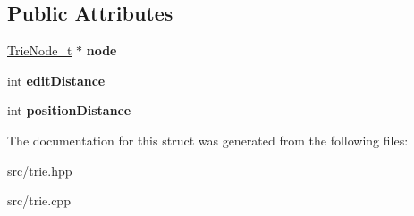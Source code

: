 \subsection*{Public Attributes}
\begin{DoxyCompactItemize}
\item 
\hyperlink{classtrie_1_1TrieNode__t}{Trie\+Node\+\_\+t} $\ast$ {\bfseries node}\hypertarget{structtrie_1_1ActiveNode__t_ad0756df7e15cf7b3eb69087c53e3a6b4}{}\label{structtrie_1_1ActiveNode__t_ad0756df7e15cf7b3eb69087c53e3a6b4}

\item 
int {\bfseries edit\+Distance}\hypertarget{structtrie_1_1ActiveNode__t_ab72477e4248864e89aec5f8fdd02c202}{}\label{structtrie_1_1ActiveNode__t_ab72477e4248864e89aec5f8fdd02c202}

\item 
int {\bfseries position\+Distance}\hypertarget{structtrie_1_1ActiveNode__t_ab86d402decf8ec5484893ae77ebf8f8c}{}\label{structtrie_1_1ActiveNode__t_ab86d402decf8ec5484893ae77ebf8f8c}

\end{DoxyCompactItemize}


The documentation for this struct was generated from the following files\+:\begin{DoxyCompactItemize}
\item 
src/trie.\+hpp\item 
src/trie.\+cpp\end{DoxyCompactItemize}
